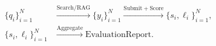 \documentclass[border=4pt]{standalone}
\begin{document}
$\displaystyle
\begin{aligned}
\{q_i\}_{i=1}^{N}
&\xrightarrow{\mathrm{Search/RAG}}\{y_i\}_{i=1}^{N}
\xrightarrow{\mathrm{Submit+Score}}
\{s_i,\ell_i\}_{i=1}^{N},\\
\{s_i,\ell_i\}_{i=1}^{N}
&\xrightarrow{\mathrm{Aggregate}}\mathrm{EvaluationReport}.
\end{aligned}
$
\end{document}
